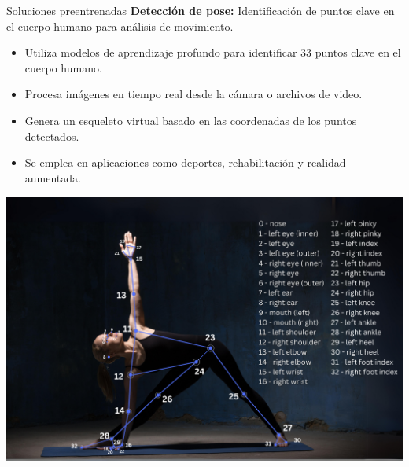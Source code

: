 \begin{frame}{Soluciones preentrenadas}
    \textbf{Detección de pose:} Identificación de puntos clave en el cuerpo humano para análisis de movimiento.
    \begin{itemize}
        \item Utiliza modelos de aprendizaje profundo para identificar 33 puntos clave en el cuerpo humano.
        \item Procesa imágenes en tiempo real desde la cámara o archivos de video.
        \item Genera un esqueleto virtual basado en las coordenadas de los puntos detectados.
        \item Se emplea en aplicaciones como deportes, rehabilitación y realidad aumentada.
    \end{itemize}    
    \begin{center}
        \includegraphics[width=0.6\linewidth]{01_MediaPipe/pose_landmarks.png}
    \end{center}
\end{frame}

